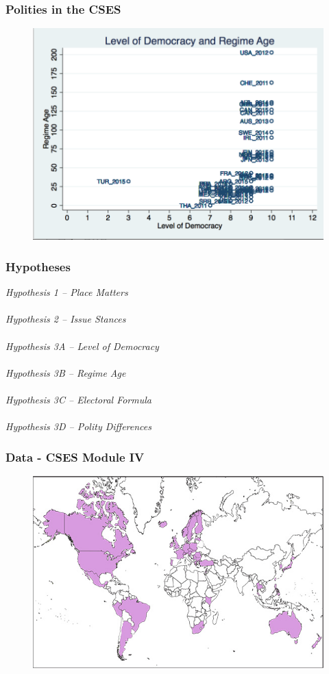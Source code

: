 \documentclass[20pt]{beamer}
\newcommand\e{\emph}
\begin{document}
\begin{frame}
\frametitle{Polities in the CSES}
\begin{figure}[ht!]    \centering
	{	 \includegraphics[width=.8\textwidth]{DemAge}}
\end{figure}
\end{frame}

\begingroup
\begin{frame}
\footnotesize
\frametitle{Hypotheses}
\e {Hypothesis 1 -- Place Matters} \\
~~\\
\e{Hypothesis 2 -- Issue Stances} \\
~~\\
\e{Hypothesis 3A -- Level of Democracy} \\
~~\\
\e{Hypothesis 3B -- Regime Age} \\
~~\\
\e{Hypothesis 3C -- Electoral Formula}\\
~~\\
\e{Hypothesis 3D -- Polity Differences} 

\end{frame}

\begin{frame}
\frametitle{Data - CSES Module IV}
\begin{figure}[H]    \centering
	{	 \includegraphics[width=.9\textwidth]{Mod4}}
\end{figure}
\end{frame}
\end{document}
